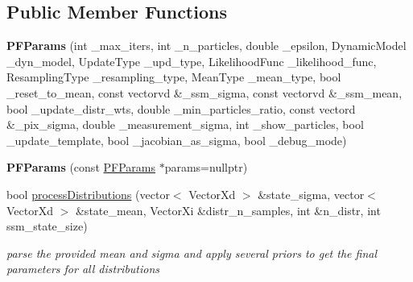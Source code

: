 \subsection*{Public Member Functions}
\begin{DoxyCompactItemize}
\item 
\hypertarget{structPFParams_a055a714bd354ff51f1f796449ce1a9b4}{{\bfseries P\-F\-Params} (int \-\_\-max\-\_\-iters, int \-\_\-n\-\_\-particles, double \-\_\-epsilon, Dynamic\-Model \-\_\-dyn\-\_\-model, Update\-Type \-\_\-upd\-\_\-type, Likelihood\-Func \-\_\-likelihood\-\_\-func, Resampling\-Type \-\_\-resampling\-\_\-type, Mean\-Type \-\_\-mean\-\_\-type, bool \-\_\-reset\-\_\-to\-\_\-mean, const vectorvd \&\-\_\-ssm\-\_\-sigma, const vectorvd \&\-\_\-ssm\-\_\-mean, bool \-\_\-update\-\_\-distr\-\_\-wts, double \-\_\-min\-\_\-particles\-\_\-ratio, const vectord \&\-\_\-pix\-\_\-sigma, double \-\_\-measurement\-\_\-sigma, int \-\_\-show\-\_\-particles, bool \-\_\-update\-\_\-template, bool \-\_\-jacobian\-\_\-as\-\_\-sigma, bool \-\_\-debug\-\_\-mode)}\label{structPFParams_a055a714bd354ff51f1f796449ce1a9b4}

\item 
\hypertarget{structPFParams_a50a71f209cab053dc2959db4018115fa}{{\bfseries P\-F\-Params} (const \hyperlink{structPFParams}{P\-F\-Params} $\ast$params=nullptr)}\label{structPFParams_a50a71f209cab053dc2959db4018115fa}

\item 
\hypertarget{structPFParams_a00a5be7ba67294d100efffa9a6613aed}{bool \hyperlink{structPFParams_a00a5be7ba67294d100efffa9a6613aed}{process\-Distributions} (vector$<$ Vector\-Xd $>$ \&state\-\_\-sigma, vector$<$ Vector\-Xd $>$ \&state\-\_\-mean, Vector\-Xi \&distr\-\_\-n\-\_\-samples, int \&n\-\_\-distr, int ssm\-\_\-state\-\_\-size)}\label{structPFParams_a00a5be7ba67294d100efffa9a6613aed}

\begin{DoxyCompactList}\small\item\em parse the provided mean and sigma and apply several priors to get the final parameters for all distributions \end{DoxyCompactList}\end{DoxyCompactItemize}
